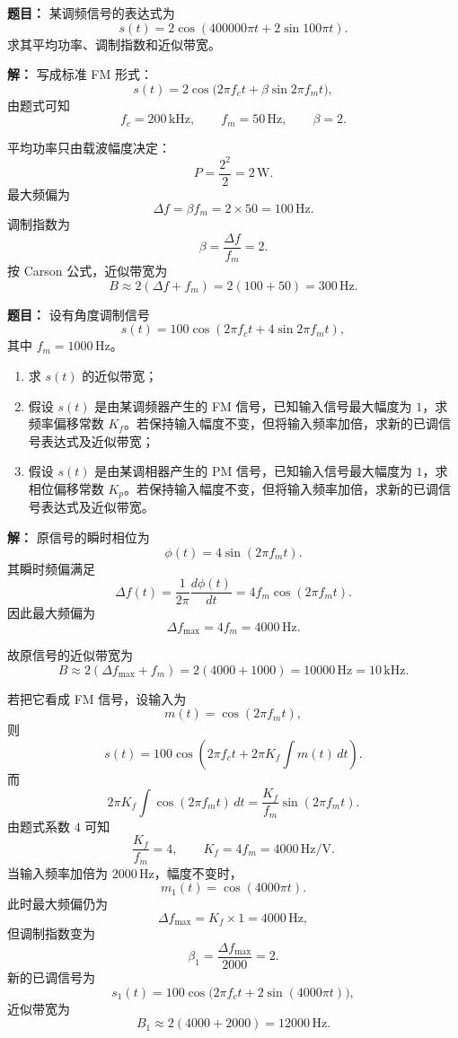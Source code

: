 \medskip
{}
\textbf{题目：}
某调频信号的表达式为
\[
s(t)=2\cos(400000\pi t+2\sin100\pi t).
\]
求其平均功率、调制指数和近似带宽。

\par\textbf{解：}
写成标准 FM 形式：
\[
s(t)=2\cos\bigl(2\pi f_ct+\beta\sin 2\pi f_mt\bigr),
\]
由题式可知
\[
f_c=200\,\mathrm{kHz},\qquad f_m=50\,\mathrm{Hz},\qquad \beta=2.
\]

平均功率只由载波幅度决定：
\[
P=\frac{2^2}{2}=2\,\mathrm{W}.
\]
最大频偏为
\[
\Delta f=\beta f_m=2\times 50=100\,\mathrm{Hz}.
\]
调制指数为
\[
\beta=\frac{\Delta f}{f_m}=2.
\]
按 Carson 公式，近似带宽为
\[
B\approx 2(\Delta f+f_m)=2(100+50)=300\,\mathrm{Hz}.
\]

\medskip
{}
\textbf{题目：}
设有角度调制信号
\[
s(t)=100\cos(2\pi f_ct+4\sin2\pi f_mt),
\]
其中 $f_m=1000\,\mathrm{Hz}$。

\begin{enumerate}
\item 求 $s(t)$ 的近似带宽；
\item 假设 $s(t)$ 是由某调频器产生的 FM 信号，已知输入信号最大幅度为 $1$，求频率偏移常数 $K_f$。若保持输入幅度不变，但将输入频率加倍，求新的已调信号表达式及近似带宽；
\item 假设 $s(t)$ 是由某调相器产生的 PM 信号，已知输入信号最大幅度为 $1$，求相位偏移常数 $K_p$。若保持输入幅度不变，但将输入频率加倍，求新的已调信号表达式及近似带宽。
\end{enumerate}

\par\textbf{解：}
原信号的瞬时相位为
\[
\phi(t)=4\sin(2\pi f_m t).
\]
其瞬时频偏满足
\[
\Delta f(t)=\frac{1}{2\pi}\frac{d\phi(t)}{dt}=4f_m\cos(2\pi f_mt).
\]
因此最大频偏为
\[
\Delta f_{\max}=4f_m=4000\,\mathrm{Hz}.
\]

故原信号的近似带宽为
\[
B\approx 2(\Delta f_{\max}+f_m)=2(4000+1000)=10000\,\mathrm{Hz}=10\,\mathrm{kHz}.
\]

若把它看成 FM 信号，设输入为
\[
m(t)=\cos(2\pi f_mt),
\]
则
\[
s(t)=100\cos\left(2\pi f_ct+2\pi K_f\int m(t)\,dt\right).
\]
而
\[
2\pi K_f\int \cos(2\pi f_mt)\,dt=\frac{K_f}{f_m}\sin(2\pi f_mt).
\]
由题式系数 $4$ 可知
\[
\frac{K_f}{f_m}=4,
\qquad
K_f=4f_m=4000\,\mathrm{Hz/V}.
\]
当输入频率加倍为 $2000\,\mathrm{Hz}$，幅度不变时，
\[
m_1(t)=\cos(4000\pi t).
\]
此时最大频偏仍为
\[
\Delta f_{\max}=K_f\times 1=4000\,\mathrm{Hz},
\]
但调制指数变为
\[
\beta_1=\frac{\Delta f_{\max}}{2000}=2.
\]
新的已调信号为
\[
s_1(t)=100\cos\bigl(2\pi f_ct+2\sin(4000\pi t)\bigr),
\]
近似带宽为
\[
B_1\approx 2(4000+2000)=12000\,\mathrm{Hz}.
\]

